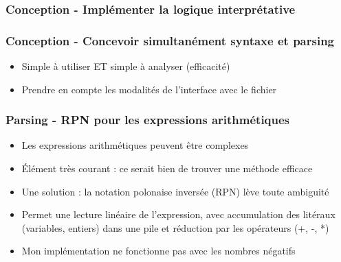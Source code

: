 \documentclass{beamer}
\begin{document}
\begin{frame}[fragile]
\frametitle{Conception - Implémenter la logique interprétative}
\begin{scriptsize}

\end{scriptsize}
\end{frame}


\begin{frame}
\frametitle{Conception - Concevoir simultanément syntaxe et parsing}
\begin{itemize}
\item Simple à utiliser ET simple à analyser (efficacité)
\item Prendre en compte les modalités de l'interface avec le fichier
\end{itemize}
\end{frame}

\begin{frame}
\frametitle{Parsing - RPN pour les expressions arithmétiques}
\begin{itemize}
\item Les expressions arithmétiques peuvent être complexes
\item Élément très courant : ce serait bien de trouver une méthode efficace
\item Une solution : la notation polonaise inversée (RPN) lève toute ambiguité
\item Permet une lecture linéaire de l'expression, avec accumulation des litéraux (variables, entiers) dans une pile et réduction par les opérateurs (+, -, *)
\item Mon implémentation ne fonctionne pas avec les nombres négatifs
\end{itemize}
\end{frame}
\end{document}

